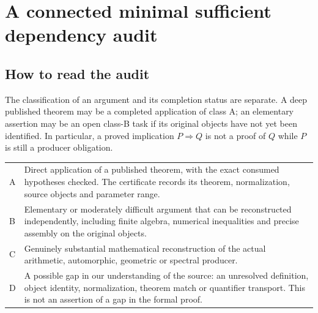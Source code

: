 \section{A connected minimal sufficient dependency audit}
\label{sec:dependency-audit-v30}


\subsection{How to read the audit}

The classification of an argument and its completion status are separate.
A deep published theorem may be a completed application of class A; an
elementary assertion may be an open class-B task if its original objects
have not yet been identified.  In particular, a proved implication
$P\Rightarrow Q$ is not a proof of $Q$ while $P$ is still a producer
obligation.

\begin{center}
\begin{tabular}{p{.08\linewidth}p{.83\linewidth}}
A&Direct application of a published theorem, with the exact consumed
hypotheses checked.  The certificate records its theorem, normalization,
source objects and parameter range.\\
B&Elementary or moderately difficult argument that can be reconstructed
independently, including finite algebra, numerical inequalities and
precise assembly on the original objects.\\
C&Genuinely substantial mathematical reconstruction of the actual
arithmetic, automorphic, geometric or spectral producer.\\
D&A possible gap in our understanding of the source: an unresolved
definition, object identity, normalization, theorem match or quantifier
transport.  This is not an assertion of a gap in the formal proof.\\
\end{tabular}
\end{center}

